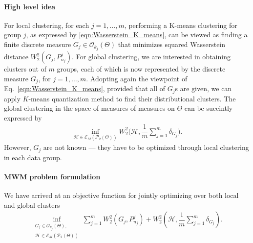 \paragraph{High level idea}
For local clustering, for each $j = 1,\ldots, m$,
performing a K-means clustering for group $j$, as expressed by
\eqref{eqn:Wasserstein_K_means}, can be viewed as finding a finite discrete measure $G_{j} 
\in \mathcal{O}_{k_{j}}(\Theta)$ that minimizes squared Wasserstein distance $W_{2}^{2}
(G_{j},P_{n_{j}}^{j})$. For global clustering, we are interested in 
obtaining clusters out of $m$ groups, each of which is now represented by the
discrete measure $G_j$, for $j=1,\ldots,m$. 
Adopting again the viewpoint of Eq.~\eqref{eqn:Wasserstein_K_means}, 
provided that all of $G_{j}$s are given, we can apply $K$-means quantization method 
to find their distributional clusters. The global clustering in the
space of measures of measures on $\Theta$ can be succintly expressed by
\vspace{-6pt}
\begin{eqnarray}
\mathop {\inf }\limits_{\mathcal{H} \in \mathcal{E}_{M}(\mathcal{P}_{2}(\Theta))}{W_{2}^{2}\biggr(
\mathcal{H},\dfrac{1}{m}\sum \limits_{j=1}^{m}{\delta_{G_{j}}}\biggr)}. \nonumber
\end{eqnarray}
%
However, $G_{j}$ are not known --- they have to be optimized through local clustering in 
each data group.
\paragraph{MWM problem formulation} We have arrived at an objective function for jointly
optimizing over both local and global clusters
\vspace{-6pt}
\begin{eqnarray}
\mathop {\inf }\limits_{\substack {G_{j} \in \mathcal{O}_{k_{j}}(\Theta), \\\mathcal{H} \in 
\mathcal{E}_{M}(\mathcal{P}_{2}(\Theta))}}{\mathop {\sum }\limits_{j=1}^{m}{W_{2}
^{2}(G_{j},P_{n_{j}}^{j})}}
+ W_{2}^{2}(\mathcal{H},\dfrac{1}{m}\mathop {\sum }\limits_{j=1}^{m}{\delta_{G_{j}}}). \label{eqn:multilevel_Kmeans_typeone}
\end{eqnarray}

